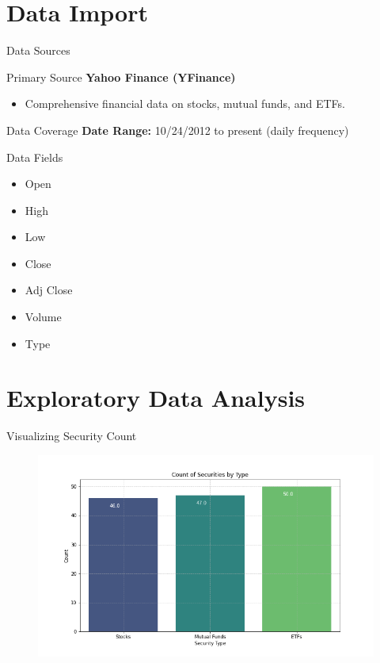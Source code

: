 \documentclass{beamer}
\begin{document}
\section{Data Import}
\begin{frame}{Data Sources}
    \begin{block}{Primary Source}
        \textbf{Yahoo Finance (YFinance)}
        \begin{itemize}
            \item Comprehensive financial data on stocks, mutual funds, and ETFs.
        \end{itemize}
    \end{block}

    \begin{block}{Data Coverage}
        \textbf{Date Range:} 10/24/2012 to present (daily frequency)
    \end{block}

    \begin{block}{Data Fields}
        \begin{multicols}{2}
        \begin{itemize}
            \item Open
            \item High
            \item Low
            \item Close
            \item Adj Close
            \item Volume
            \item Type
        \end{itemize}
        \end{multicols}
    \end{block}
\end{frame}

\section{Exploratory Data Analysis}
\begin{frame}[fragile]{Visualizing Security Count}
    \begin{figure}
        \centering
        \includegraphics[width=\textwidth]{histogram_security_count.png}
    \end{figure}
\end{frame}
\end{document}

